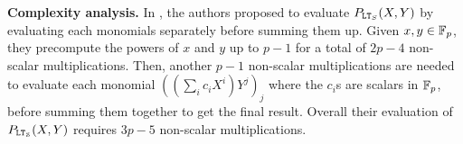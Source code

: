 
\textbf{Complexity analysis.}
In \cite{TLWRK20}, the authors proposed to evaluate $P_{\mathtt{LT}_S}(X,Y)$ by evaluating each monomials separately before summing them up. 
Given $x,y \in \mathbb{F}_p$, they precompute the powers of $x$ and $y$ up to $p-1$ for a total of $2p-4$ non-scalar multiplications. 
Then, another $p-1$ non-scalar multiplications are needed to evaluate each monomial $((\sum_i c_i X^i)Y^j)_{j}$ where the $c_i$s are scalars in $\mathbb{F}_p$, before summing them together to get the final result. 
Overall their evaluation of $P_{\mathtt{LT}_{\mathcal{S}}}(X,Y)$ requires $3p-5$ non-scalar multiplications.

